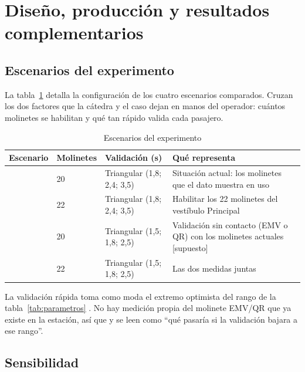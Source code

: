 \section{Diseño, producción y resultados complementarios}
\label{anx:resultados}

\subsection{Escenarios del experimento}
\label{anx:escenarios}

La tabla~\ref{tab:escenarios-experimento} detalla la configuración de los cuatro escenarios comparados. Cruzan
los dos factores que la cátedra y el caso dejan en manos del operador: cuántos molinetes se habilitan y qué tan
rápido valida cada pasajero.

\begin{table}[H]
\centering
\caption{Escenarios del experimento}
\label{tab:escenarios-experimento}
\small
\begin{tabularx}{\textwidth}{@{}l l l X@{}}
\toprule
Escenario & Molinetes & Validación (s) & Qué representa \\
\midrule
\EO{} & 20 & Triangular (1,8; 2,4; 3,5) & Situación actual: los molinetes que el dato muestra en uso \\
\EI{} & 22 & Triangular (1,8; 2,4; 3,5) & Habilitar los 22 molinetes del vestíbulo Principal \\
\ET{} & 20 & Triangular (1,5; 1,8; 2,5) & Validación sin contacto (EMV o QR) con los molinetes actuales [supuesto] \\
\EIT{} & 22 & Triangular (1,5; 1,8; 2,5) & Las dos medidas juntas \\
\bottomrule
\end{tabularx}
\end{table}

La validación rápida toma como moda el extremo optimista del rango de la tabla~\ref{tab:parametros}
\parencite[Exh.~10-27]{tcqsm2013}. No hay medición propia del molinete EMV/QR que ya existe en la estación,
así que \ET{} y \EIT{} se leen como ``qué pasaría si la validación bajara a ese rango''.

\subsection{Sensibilidad}
\label{anx:sensibilidad}

